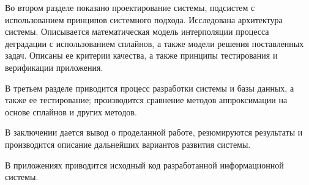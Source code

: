 Во втором разделе показано проектирование системы, подсистем с использованием принципов системного подхода. 
Исследована архитектура системы. 
Описывается математическая модель интерполяции процесса деградации с использованием сплайнов, а также модели решения поставленных задач. 
Описаны ее критерии качества, а также принципы тестирования и верификации приложения.

В третьем разделе приводится процесс разработки системы и базы данных, а также ее тестирование; производится сравнение методов аппроксимации на основе сплайнов и других методов.

В заключении дается вывод о проделанной работе, резюмируются результаты и производится описание дальнейших вариантов развития системы.

В приложениях приводится исходный код разработанной информационной системы.






\clearpage
